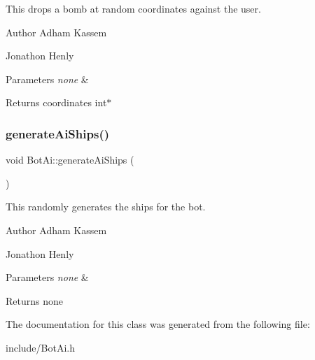 This drops a bomb at random coordinates against the user. \begin{DoxyAuthor}{Author}
Adham Kassem 

Jonathon Henly 
\end{DoxyAuthor}

\begin{DoxyParams}{Parameters}
{\em none} & \\
\hline
\end{DoxyParams}
\begin{DoxyReturn}{Returns}
coordinates int$\ast$ 
\end{DoxyReturn}
\mbox{\label{classBotAi_a26e701cc128abb1862c49e4cad249a12}} 
\subsubsection{\texorpdfstring{generate\+Ai\+Ships()}{generateAiShips()}}
{\footnotesize\ttfamily void Bot\+Ai\+::generate\+Ai\+Ships (\begin{DoxyParamCaption}{ }\end{DoxyParamCaption})\hspace{0.3cm}{\ttfamily [inline]}}

This randomly generates the ships for the bot. \begin{DoxyAuthor}{Author}
Adham Kassem 

Jonathon Henly 
\end{DoxyAuthor}

\begin{DoxyParams}{Parameters}
{\em none} & \\
\hline
\end{DoxyParams}
\begin{DoxyReturn}{Returns}
none 
\end{DoxyReturn}


The documentation for this class was generated from the following file\+:\begin{DoxyCompactItemize}
\item 
include/Bot\+Ai.\+h\end{DoxyCompactItemize}
